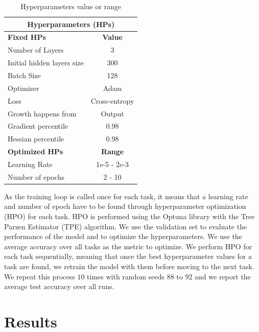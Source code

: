 \documentclass[11pt]{article}
\begin{document}
\begin{table}[h!]
    \centering
    \begin{tabular}{|l|c|}
    \hline
    \multicolumn{2}{|c|}{\textbf{Hyperparameters (HPs)}} \\
    \hline
    \textbf{Fixed HPs} & \textbf{Value}\\
    \hline
    Number of Layers & 3 \\
    Initial hidden layers size & 300 \\
    Batch Size & 128 \\
    Optimizer & Adam \\
    Loss & Cross-entropy \\
    Growth happens from & Output \\
    Gradient percentile & 0.98 \\
    Hessian percentile & 0.98 \\
    \hline
    \hline
    \textbf{Optimized HPs} & \textbf{Range}\\
    \hline
    Learning Rate & 1e-5 - 2e-3 \\
    Number of epochs & 2 - 10 \\
    \hline
    \end{tabular}
    \caption{Hyperparameters value or range}
    \label{table:HPs}
\end{table}


As the training loop is called once for each task, it means that a learning rate and number of epoch have to be found through hyperparameter optimization (HPO) for each task. HPO is performed using the Optuna library \cite{optuna} with the Tree Parzen Estimator (TPE) algorithm. We use the validation set to evaluate the performance of the model and to optimize the hyperparameters. We use the average accuracy over all tasks as the metric to optimize. We perform HPO for each task sequentially, meaning that once the best hyperparameter values for a task are found, we retrain the model with them before moving to the next task. We repeat this process $10$ times with random seeds 88 to 92 and we report the average test accuracy over all runs.



\section{Results}
\end{document}
